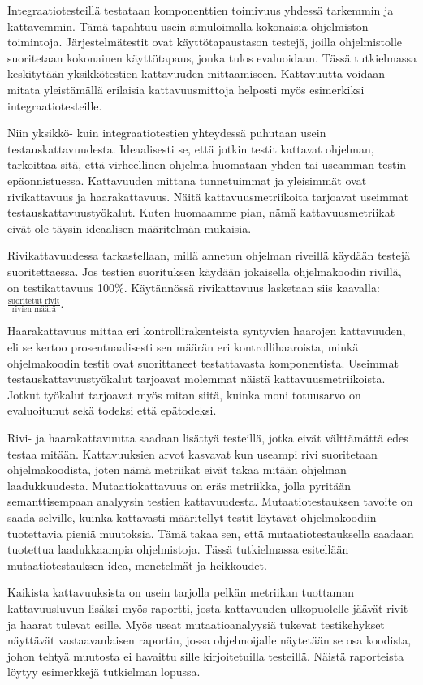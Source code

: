 \documentclass{tktltiki}
\begin{document}
Integraatiotesteillä testataan komponenttien toimivuus yhdessä tarkemmin ja kattavemmin. Tämä tapahtuu usein simuloimalla kokonaisia ohjelmiston toimintoja. Järjestelmätestit ovat käyttötapaustason testejä, joilla ohjelmistolle suoritetaan kokonainen käyttötapaus, jonka tulos evaluoidaan. Tässä tutkielmassa keskitytään yksikkötestien kattavuuden mittaamiseen. Kattavuutta voidaan mitata yleistämällä erilaisia kattavuusmittoja helposti myös esimerkiksi integraatiotesteille. 

Niin yksikkö- kuin integraatiotestien yhteydessä puhutaan usein testauskattavuudesta. Ideaalisesti se, että jotkin testit kattavat ohjelman, tarkoittaa sitä, että virheellinen ohjelma huomataan yhden tai useamman testin epäonnistuessa. Kattavuuden mittana tunnetuimmat ja yleisimmät ovat rivikattavuus ja haarakattavuus. Näitä kattavuusmetriikoita tarjoavat useimmat testauskattavuustyökalut. Kuten huomaamme pian, nämä kattavuusmetriikat eivät ole täysin ideaalisen määritelmän mukaisia.

Rivikattavuudessa tarkastellaan, millä annetun ohjelman riveillä käydään testejä suoritettaessa. Jos testien suorituksen käydään jokaisella ohjelmakoodin rivillä, on testikattavuus 100\%. Käytännössä rivikattavuus lasketaan siis kaavalla: $\frac{\text{suoritetut rivit}}{\text{rivien määrä}}$.

Haarakattavuus mittaa eri kontrollirakenteista syntyvien haarojen kattavuuden, eli se kertoo prosentuaalisesti sen määrän eri kontrollihaaroista, minkä ohjelmakoodin testit ovat suorittaneet testattavasta komponentista. Useimmat testauskattavuustyökalut tarjoavat molemmat näistä kattavuusmetriikoista. Jotkut työkalut tarjoavat myös mitan siitä, kuinka moni totuusarvo on evaluoitunut sekä todeksi että epätodeksi.

Rivi- ja haarakattavuutta saadaan lisättyä testeillä, jotka eivät välttämättä edes testaa mitään. Kattavuuksien arvot kasvavat kun useampi rivi suoritetaan ohjelmakoodista, joten nämä metriikat eivät takaa mitään ohjelman laadukkuudesta. Mutaatiokattavuus on eräs metriikka, jolla pyritään semanttisempaan analyysin testien kattavuudesta. Mutaatiotestauksen tavoite on saada selville, kuinka kattavasti määritellyt testit löytävät ohjelmakoodiin tuotettavia pieniä muutoksia. Tämä takaa sen, että mutaatiotestauksella saadaan tuotettua laadukkaampia ohjelmistoja. Tässä tutkielmassa esitellään mutaatiotestauksen idea, menetelmät ja heikkoudet. 

Kaikista kattavuuksista on usein tarjolla pelkän metriikan tuottaman kattavuusluvun lisäksi myös raportti, josta kattavuuden ulkopuolelle jäävät rivit ja haarat tulevat esille. Myös useat mutaatioanalyysiä tukevat testikehykset näyttävät vastaavanlaisen raportin, jossa ohjelmoijalle näytetään se osa koodista, johon tehtyä muutosta ei havaittu sille kirjoitetuilla testeillä. Näistä raporteista löytyy esimerkkejä tutkielman lopussa.
\end{document}

